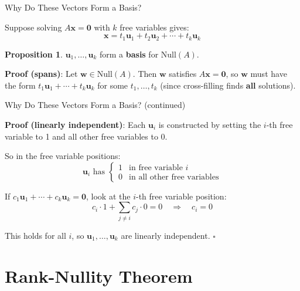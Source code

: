 \documentclass[10pt]{beamer}
\theoremstyle{definition}
\newtheorem{prop}{Proposition}[section]
\newcommand{\x}[1]{\alert{\textbf{#1}}}
\begin{document}
\begin{frame}{Why Do These Vectors Form a Basis?}

Suppose solving $A\mathbf{x} = \mathbf{0}$ with $k$ free variables gives:
$$\mathbf{x} = t_1 \mathbf{u}_1 + t_2 \mathbf{u}_2 + \cdots + t_k \mathbf{u}_k$$

\begin{prop}
$\mathbf{u}_1, \ldots, \mathbf{u}_k$ form a \x{basis} for $\text{Null}(A)$.
\end{prop}

\x{Proof (spans)}: Let $\mathbf{w} \in \text{Null}(A)$. Then $\mathbf{w}$ satisfies $A\mathbf{x} = \mathbf{0}$, so $\mathbf{w}$ must have the form $t_1 \mathbf{u}_1 + \cdots + t_k \mathbf{u}_k$ for some $t_1, \ldots, t_k$ (since cross-filling finds \textbf{all} solutions).

\end{frame}

\begin{frame}{Why Do These Vectors Form a Basis? (continued)}

\x{Proof (linearly independent)}: Each $\mathbf{u}_i$ is constructed by setting the $i$-th free variable to 1 and all other free variables to 0.

\vspace{0.5em}

So in the free variable positions:
$$\mathbf{u}_i \text{ has } \begin{cases} 1 & \text{in free variable } i \\ 0 & \text{in all other free variables} \end{cases}$$

\vspace{0.5em}

If $c_1 \mathbf{u}_1 + \cdots + c_k \mathbf{u}_k = \mathbf{0}$, look at the $i$-th free variable position:
$$c_i \cdot 1 + \sum_{j \neq i} c_j \cdot 0 = 0 \quad \Rightarrow \quad c_i = 0$$

This holds for all $i$, so $\mathbf{u}_1, \ldots, \mathbf{u}_k$ are linearly independent. $\square$

\end{frame}

\section{Rank-Nullity Theorem}
\end{document}
